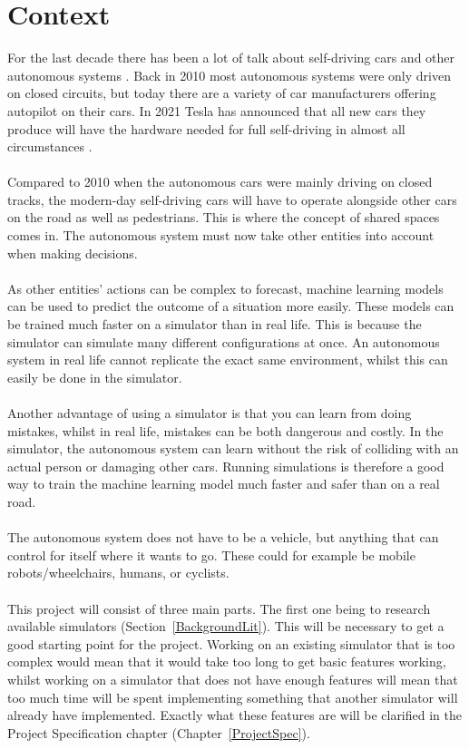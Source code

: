 \section{Context}
For the last decade there has been a lot of talk about self-driving cars and other autonomous systems \cite{markoff_2010}. Back in 2010 most autonomous systems were only driven on closed circuits, but today there are a variety of car manufacturers offering autopilot on their cars. In 2021 Tesla has announced that all new cars they produce will have the hardware needed for full self-driving in almost all circumstances \cite{teslaSelf}. 
\\~\\ 
Compared to 2010 when the autonomous cars were mainly driving on closed tracks, the modern-day self-driving cars will have to operate alongside other cars on the road as well as pedestrians.  This is where the concept of shared spaces comes in. The autonomous system must now take other entities into account when making decisions. 
\\~\\ 
As other entities’ actions can be complex to forecast, machine learning models can be used to predict the outcome of a situation more easily. These models can be trained much faster on a simulator than in real life. This is because the simulator can simulate many different configurations at once. An autonomous system in real life cannot replicate the exact same environment, whilst this can easily be done in the simulator.  
\\~\\ 
Another advantage of using a simulator is that you can learn from doing mistakes, whilst in real life, mistakes can be both dangerous and costly. In the simulator, the autonomous system can learn without the risk of colliding with an actual person or damaging other cars. Running simulations is therefore a good way to train the machine learning model much faster and safer than on a real road.  
\\~\\ 
The autonomous system does not have to be a vehicle, but anything that can control for itself where it wants to go. These could for example be mobile robots/wheelchairs, humans, or cyclists. 
\\~\\ 
This project will consist of three main parts. The first one being to research available simulators (Section~\ref{BackgroundLit}). This will be necessary to get a good starting point for the project. Working on an existing simulator that is too complex would mean that it would take too long to get basic features working, whilst working on a simulator that does not have enough features will mean that too much time will be spent implementing something that another simulator will already have implemented. Exactly what these features are will be clarified in the Project Specification chapter (Chapter~\ref{ProjectSpec}). 
